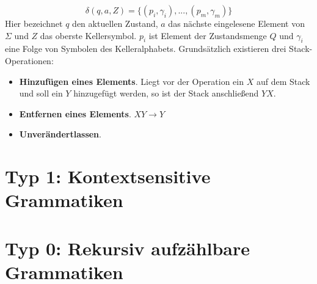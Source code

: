 \documentclass[11pt,a4paper]{scrreport}
\theoremstyle{remark}
\theoremstyle{custom}
\begin{document}
\[\delta(q, a, Z) = \lbrace (p_i, \gamma_i), ..., (p_m, \gamma_m) \rbrace \]
Hier bezeichnet $q$ den aktuellen Zustand, $a$ das nächste eingelesene Element von $\Sigma$ und $Z$ das oberste Kellersymbol. $p_i$ ist Element der Zustandsmenge $Q$ und $\gamma_i$ eine Folge von Symbolen des Kelleralphabets. Grundsätzlich existieren drei Stack-Operationen:
\begin{itemize}
\item \textbf{Hinzufügen eines Elements}. Liegt vor der Operation ein $X$ auf dem Stack und soll ein $Y$ hinzugefügt werden, so ist der Stack anschließend $YX$.
\item \textbf{Entfernen eines Elements}. $XY \rightarrow Y$
\item \textbf{Unverändertlassen}.
\end{itemize}

\section{Typ 1: Kontextsensitive Grammatiken}
\section{Typ 0: Rekursiv aufzählbare Grammatiken}
\pagebreak
\normalem
\printbibliography
\end{document}
